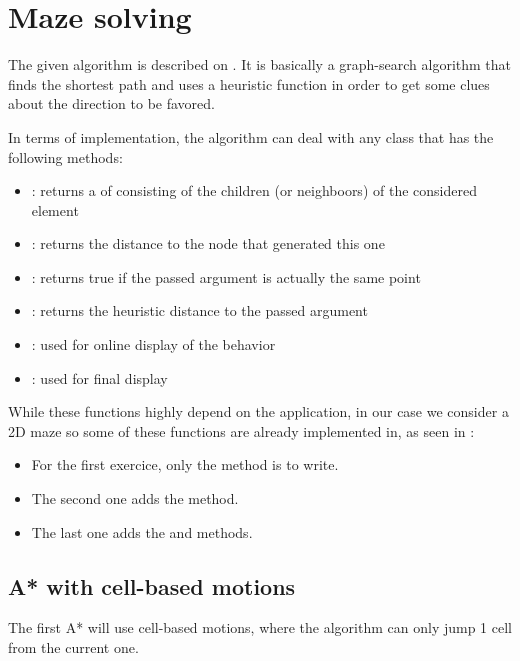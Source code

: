 \documentclass{ecnreport}
\begin{document}
\section{Maze solving}

The given algorithm is described on . It is basically a graph-search algorithm that
finds the shortest path and uses a heuristic function in order to get some clues about the direction to be favored.

In terms of implementation, the algorithm can deal with any  class that has the following methods:
\begin{itemize}
 \item {}: returns a  of  consisting of the children (or neighboors) of the considered
 element
 \item {}: returns the distance to the node that generated this one
 \item {}: returns true if the passed argument is actually the same point
 \item {}: returns the heuristic distance to the passed argument
 \item {}: used for online display of the behavior
 \item {}: used for final display
\end{itemize}


While these functions highly depend on the application, in our case we consider a 2D maze so some of these functions are already implemented in, as seen in :
\begin{itemize}
 \item For the first exercice, only the  method is to write.
 \item The second one adds the  method.
 \item The last one adds the  and  methods.
\end{itemize}



\subsection{A* with cell-based motions}

The first A* will use cell-based motions, where the algorithm can only jump 1 cell from the current one.
\end{document}
